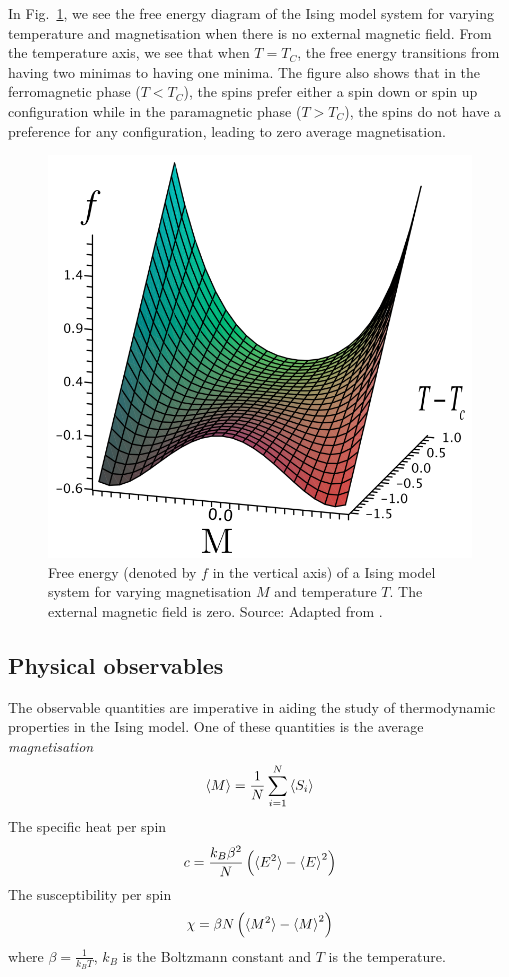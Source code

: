 \documentclass[pra,aps,superscriptaddress,amssymb,amsmath,reprint,noeprint,floatfix]{revtex4-2}
\begin{document}
In Fig.\ \ref{fig:FreeEnergy}, we see the free energy diagram of the Ising model system for varying temperature and magnetisation when there is no external magnetic field. From the temperature axis, we see that when $T=T_C$, the free energy transitions from having two minimas to having one minima. The figure also shows that in the ferromagnetic phase ($T<T_C$), the spins prefer either a spin down or spin up configuration while in the paramagnetic phase ($T>T_C$), the spins do not have a preference for any configuration, leading to zero average magnetisation.
\begin{figure}
    \centering
    \includegraphics[width=0.5\linewidth]{Figures/ising_model_free_energy.png}
    \caption{Free energy (denoted by $f$ in the vertical axis) of a Ising model system for varying magnetisation $M$ and temperature $T$. The external magnetic field is zero. Source: Adapted from \cite{ProvatasTextbook}.}
    \label{fig:FreeEnergy}
\end{figure}

\subsection{\label{subsec:observables}Physical observables}
The observable quantities are imperative in aiding the study of thermodynamic properties in the Ising model. One of these quantities is the average \textit{magnetisation}
\begin{equation}\label{eqn:magnetisation}
    \braket{M}=\frac{1}{N}\sum^{N}_{i=1} \braket{S_i}
\end{equation}
The specific heat per spin
\begin{equation}\label{eqn:specificheat}
    c=\frac{k_B\beta^2}{N}\left(\braket{E^2}-\braket{E}^2\right)
\end{equation}
The susceptibility per spin
\begin{equation}\label{eqn:susceptibility}
    \chi=\beta N \left(\braket{M^2}-\braket{M}^2\right)
\end{equation}
where $\beta=\frac{1}{k_BT}$, $k_B$ is the Boltzmann constant and $T$ is the temperature.
\end{document}
